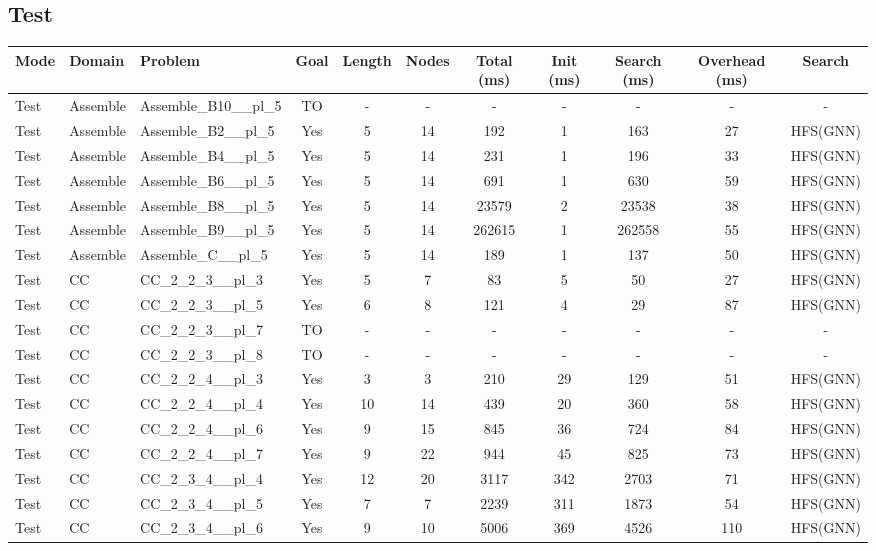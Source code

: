 \documentclass{article}
\begin{document}
\subsection*{Test}
\begin{tabular}{lllcccccccc}
\toprule
Mode & Domain & Problem & Goal & Length & Nodes & Total (ms) & Init (ms) & Search (ms) & Overhead (ms) & Search \\
\midrule
Test & Assemble & Assemble\_B10\_\_pl\_5 & TO & - & - & - & - & - & - & - \\
Test & Assemble & Assemble\_B2\_\_pl\_5 & Yes & 5 & 14 & 192 & 1 & 163 & 27 & HFS(GNN) \\
Test & Assemble & Assemble\_B4\_\_pl\_5 & Yes & 5 & 14 & 231 & 1 & 196 & 33 & HFS(GNN) \\
Test & Assemble & Assemble\_B6\_\_pl\_5 & Yes & 5 & 14 & 691 & 1 & 630 & 59 & HFS(GNN) \\
Test & Assemble & Assemble\_B8\_\_pl\_5 & Yes & 5 & 14 & 23579 & 2 & 23538 & 38 & HFS(GNN) \\
Test & Assemble & Assemble\_B9\_\_pl\_5 & Yes & 5 & 14 & 262615 & 1 & 262558 & 55 & HFS(GNN) \\
Test & Assemble & Assemble\_C\_\_pl\_5 & Yes & 5 & 14 & 189 & 1 & 137 & 50 & HFS(GNN) \\
Test & CC & CC\_2\_2\_3\_\_pl\_3 & Yes & 5 & 7 & 83 & 5 & 50 & 27 & HFS(GNN) \\
Test & CC & CC\_2\_2\_3\_\_pl\_5 & Yes & 6 & 8 & 121 & 4 & 29 & 87 & HFS(GNN) \\
Test & CC & CC\_2\_2\_3\_\_pl\_7 & TO & - & - & - & - & - & - & - \\
Test & CC & CC\_2\_2\_3\_\_pl\_8 & TO & - & - & - & - & - & - & - \\
Test & CC & CC\_2\_2\_4\_\_pl\_3 & Yes & 3 & 3 & 210 & 29 & 129 & 51 & HFS(GNN) \\
Test & CC & CC\_2\_2\_4\_\_pl\_4 & Yes & 10 & 14 & 439 & 20 & 360 & 58 & HFS(GNN) \\
Test & CC & CC\_2\_2\_4\_\_pl\_6 & Yes & 9 & 15 & 845 & 36 & 724 & 84 & HFS(GNN) \\
Test & CC & CC\_2\_2\_4\_\_pl\_7 & Yes & 9 & 22 & 944 & 45 & 825 & 73 & HFS(GNN) \\
Test & CC & CC\_2\_3\_4\_\_pl\_4 & Yes & 12 & 20 & 3117 & 342 & 2703 & 71 & HFS(GNN) \\
Test & CC & CC\_2\_3\_4\_\_pl\_5 & Yes & 7 & 7 & 2239 & 311 & 1873 & 54 & HFS(GNN) \\
Test & CC & CC\_2\_3\_4\_\_pl\_6 & Yes & 9 & 10 & 5006 & 369 & 4526 & 110 & HFS(GNN) \\

\end{tabular}
\end{document}
